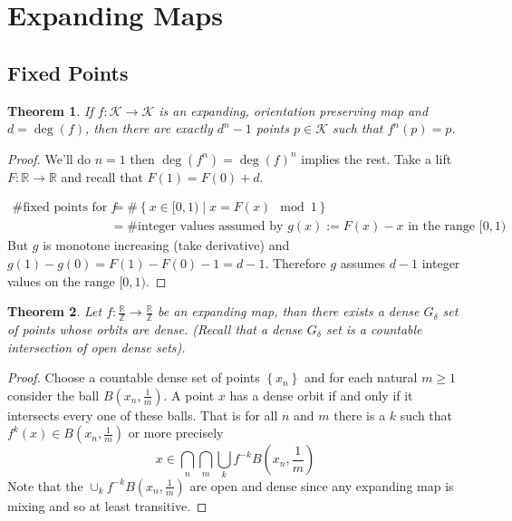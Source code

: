 \documentclass[11pt]{article}
\newcommand{\defeq}{:=}
\newcommand{\relmiddle}[1]{\mathrel{}\middle#1\mathrel{}}
\newcommand{\rmv}{\relmiddle|}
\newcommand{\R}{\mathbb{R}}
\newcommand{\Z}{\mathbb{Z}}
\newtheorem{theorem}{Theorem}[section]
\begin{document}
\section{Expanding Maps}

\subsection{Fixed Points}
\begin{theorem}
If $f:\mathcal{K}\to\mathcal{K}$ is an expanding, orientation preserving map and $d=\deg(f)$, then there are exactly $d^n-1$ points $p\in\mathcal{K}$ such that $f^n(p)=p$.
\end{theorem}

\begin{proof}
We'll do $n=1$ then $\deg(f^n)=\deg(f)^n$ implies the rest.
Take a lift $F:\R\to\R$ and recall that $F(1)=F(0)+d$.

\begin{align*}
	\#\text{fixed points for }f & = \#\left\{x\in[0,1) \rmv x=F(x) \mod 1\right\} \\
								& = \#\text{integer values assumed by }g(x)\defeq F(x) -x \text{ in the range }[0,1)
\end{align*}
But $g$ is monotone increasing (take derivative) and $g(1)-g(0)= F(1)- F(0) - 1 = d-1$.
Therefore $g$ assumes $d-1$ integer values on the range $[0,1)$.
\end{proof}

\begin{theorem}
Let $f:\frac{\R}{\Z}\to\frac{\R}{\Z}$ be an expanding map, than there exists a dense $G_\delta$ set of points whose orbits are dense.
(Recall that a dense $G_\delta$ set is a countable intersection of open dense sets).
\end{theorem}

\begin{proof}
Choose a countable dense set of points $\left\{x_n\right\}$ and for each natural $m\geq 1$ consider the ball $B\left(x_n, \frac{1}{m}\right)$.
A point $x$ has a dense orbit if and only if it intersects every one of these balls.
That is for all $n$ and $m$ there is a $k$ such that $f^k(x)\in B\left(x_n, \frac{1}{m}\right)$ or more precisely
\[
	x\in \bigcap_n \bigcap_m \bigcup_k f^{-k} B\left(x_n, \frac{1}{m}\right)
\]
Note that the $\cup_k f^{-k}B\left(x_n, \frac{1}{m}\right)$ are open and dense since any expanding map is mixing and so at least transitive.
\end{proof}
\end{document}
